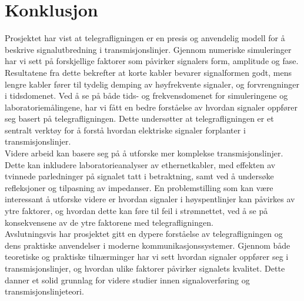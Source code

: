 \section{Konklusjon}
Prosjektet har vist at telegrafligningen er en presis og anvendelig modell for å beskrive signalutbredning i transmisjonslinjer. Gjennom numeriske simuleringer har vi sett på forskjellige faktorer som påvirker signalers form, amplitude og fase. Resultatene fra dette bekrefter at korte kabler bevarer signalformen godt, mens lengre kabler fører til tydelig demping av høyfrekvente signaler, og forvrengninger i tidsdomenet. Ved å se på både tids- og frekvensdomenet for simuleringene og laboratoriemålingene, har vi fått en bedre forståelse av hvordan signaler oppfører seg basert på telegrafligningen. Dette undersøtter at telegrafligningen er et sentralt verktøy for å forstå hvordan elektriske signaler forplanter i transmisjonslinjer.
\\[1em]
Videre arbeid kan basere seg på å utforske mer komplekse transmisjonslinjer. Dette kan inkludere laboratorieanalyser av ethernetkabler, med effekten av tvinnede parledninger på signalet tatt i betraktning, samt ved å undersøke refleksjoner og tilpasning av impedanser. En problemstilling som kan være interessant å utforske videre er hvordan signaler i høyspentlinjer kan påvirkes av ytre faktorer, og hvordan dette kan føre til feil i strømnettet, ved å se på konsekvensene av de ytre faktorene med telegrafligningen.
\\[1em]
Avslutningsvis har prosjektet gitt en dypere forståelse av telegrafligningen og dens praktiske anvendelser i moderne kommunikasjonssystemer. Gjennom både teoretiske og praktiske tilnærminger har vi sett hvordan signaler oppfører seg i transmisjonslinjer, og hvordan ulike faktorer påvirker signalets kvalitet. Dette danner et solid grunnlag for videre studier innen signaloverføring og transmisjonslinjeteori.